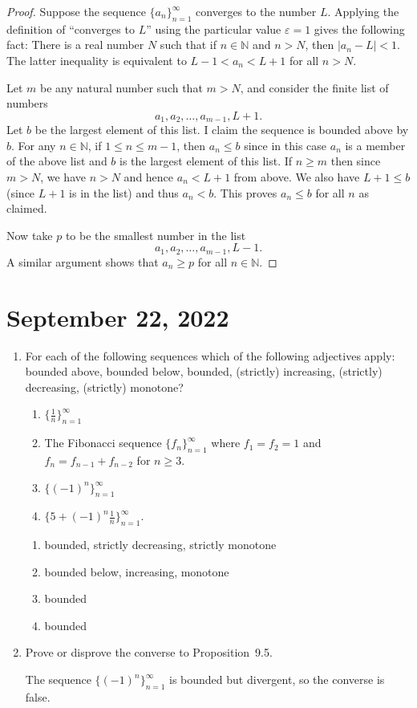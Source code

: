 \documentclass[12pt]{amsart}
\def\e{\varepsilon}
\newcommand{\N}{\mathbb{N}}
\numberwithin{equation}{section}
\theoremstyle{plain} %
\newcommand{\Sept}[1]{\section{September #1, 2022}}
\theoremstyle{definition}
\theoremstyle{remark}
\begin{document}
\begin{proof} Suppose the sequence $\{a_n\}_{n=1}^\infty$ converges to
	the number $L$. Applying the definition of ``converges to $L$'' using the particular value $\e = 1$ gives the following fact:
	There is a real number $N$ such that if $n \in \N$ and $n > N$, then $|a_n -
	L| < 1$. The latter inequality is equivalent to  $L-1 < a_n < L+1$
	for all $n > N$.
	
	Let $m$ be any natural number such that $m > N$,
	and consider the finite list of numbers
	$$
	a_1, a_2, \dots, a_{m-1}, L + 1.
	$$
	Let $b$ be the largest element of this list. I claim the sequence is bounded above by $b$.
	For any $n \in  \N$, if $1 \leq n \leq m-1$, then $a_n \leq b$ since in this case $a_n$ is a member of the above list and $b$ is the largest element of this list.
	If $n \geq m$ then since $m > N$, we have $n > N$ and hence $a_n < L + 1$ from above. We also have $L + 1 \leq b$ (since $L+1$ is in the list) and thus $a_n < b$. 
	This proves $a_n \leq b$ for all $n$ as claimed.
	
	Now take $p$ to be the smallest number in the list
	$$
	a_1, a_2, \dots, a_{m-1}, L - 1.
	$$
	A similar argument shows that $a_n \geq p$ for all $n \in \N$.
\end{proof}

\Sept{22}

\begin{enumerate}

\item For each of the following sequences which of the following adjectives apply: bounded above, bounded below, bounded, (strictly) increasing, (strictly) decreasing, (strictly) monotone?
\begin{enumerate}
\item $\{ \frac{1}{n} \}_{n=1}^\infty$
\item The Fibonacci sequence $\{ f_n \}_{n=1}^\infty$ where $f_1=f_2=1$ and $f_n= f_{n-1} + f_{n-2}$ for $n\geq 3$.
\item $\{(-1)^n \}_{n=1}^\infty$
\item $\{ 5 + (-1)^n \frac{1}{n}  \}_{n=1}^\infty$.
\end{enumerate}

\begin{framed}
\begin{enumerate}
\item bounded, strictly decreasing, strictly monotone
\item bounded below, increasing, monotone
\item bounded
\item bounded
\end{enumerate}
\end{framed}

\item Prove or disprove the converse to Proposition~9.5.
\begin{framed}
The sequence $\{(-1)^n\}_{n=1}^\infty$ is bounded but divergent, so the converse is false.
\end{framed}
\end{enumerate}
\end{document}

